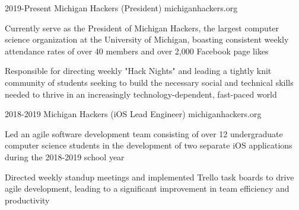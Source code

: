 

\begin{cventries}

  \cventry
    {2019-Present} %
    {Michigan Hackers (President)} %
    {michiganhackers.org} %
    {} %
    {
      \begin{cvitems} %
        \item {Currently serve as the President of Michigan Hackers, the largest computer science organization at the University of Michigan, boasting consistent weekly attendance rates of over 40 members and over 2,000 Facebook page likes}
        \item {Responsible for directing weekly "Hack Nights" and leading a tightly knit community of students seeking to build the necessary social and technical skills needed to thrive in an increasingly technology-dependent, fast-paced world}
      \end{cvitems}
    }
    
    \cventry
    {2018-2019} %
    {Michigan Hackers (iOS Lead Engineer)} %
    {michiganhackers.org} %
    {} %
    {
      \begin{cvitems} %
        \item {Led an agile software development team consisting of over 12 undergraduate computer science students in the development of two separate iOS applications during the 2018-2019 school year}
        \item {Directed weekly standup meetings and implemented Trello task boards to drive agile development, leading to a significant improvement in team efficiency and productivity}
      \end{cvitems}
    }


\end{cventries}
